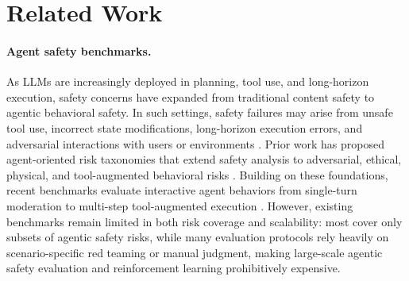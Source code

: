 

\section{Related Work}

\paragraph{Agent safety benchmarks.} As LLMs are increasingly deployed in planning, tool use, and long-horizon execution, safety concerns have expanded from traditional content safety to agentic behavioral safety. In such settings, safety failures may arise from unsafe tool use, incorrect state modifications, long-horizon execution errors, and adversarial interactions with users or environments \citep{ghosh2025safety, rjudge2024, zhang2024agentsafetybench, tur2025safearena, guo2025upwarddeceivers, verma2024operationalizing}. Prior work has proposed agent-oriented risk taxonomies that extend safety analysis to adversarial, ethical, physical, and tool-augmented behavioral risks \citep{agentharm2024, zheng2024ali,luo2025agentauditor}. Building on these foundations, recent benchmarks evaluate interactive agent behaviors from single-turn moderation to multi-step tool-augmented execution \citep{rjudge2024, zhang2024agentsafetybench, os-harm2025, riosworld2025, injecagent2024, toolsword2024, safetoolbench2025, agentdojo2024, tur2025safearena, li2026agentdyn, zhang2025agent, chen2026decodingtrustagentplatformdtapcontrollable}. However, existing benchmarks remain limited in both risk coverage and scalability: most cover only subsets of agentic safety risks, while many evaluation protocols rely heavily on scenario-specific red teaming or manual judgment, making large-scale agentic safety evaluation and reinforcement learning prohibitively expensive.


